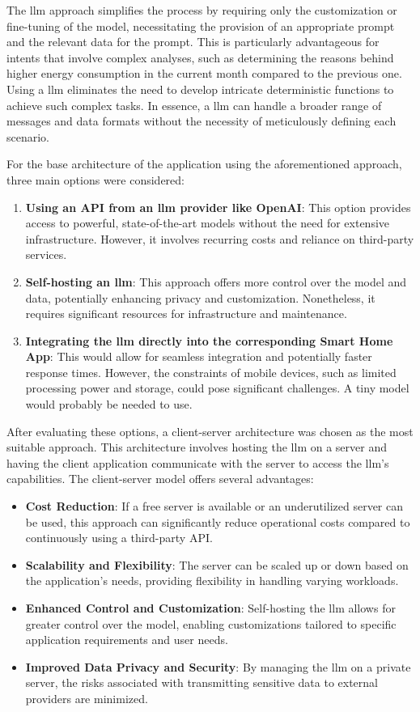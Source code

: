 The \gls{llm} approach simplifies the process by requiring only the customization or fine-tuning of the model, necessitating the provision of an appropriate prompt and the relevant data for the prompt. This is particularly advantageous for intents that involve complex analyses, such as determining the reasons behind higher energy consumption in the current month compared to the previous one. Using a \gls{llm} eliminates the need to develop intricate deterministic functions to achieve such complex tasks. In essence, a \gls{llm} can handle a broader range of messages and data formats without the necessity of meticulously defining each scenario.

For the base architecture of the application using the aforementioned approach, three main options were considered:
\begin{enumerate}
    \item \textbf{Using an API from an \gls{llm} provider like OpenAI}: This option provides access to powerful, state-of-the-art models without the need for extensive infrastructure. However, it involves recurring costs and reliance on third-party services.
    \item \textbf{Self-hosting an \gls{llm}}: This approach offers more control over the model and data, potentially enhancing privacy and customization. Nonetheless, it requires significant resources for infrastructure and maintenance.
    \item \textbf{Integrating the \gls{llm} directly into the corresponding Smart Home App}: This would allow for seamless integration and potentially faster response times. However, the constraints of mobile devices, such as limited processing power and storage, could pose significant challenges. A tiny model would probably be needed to use.
\end{enumerate}

After evaluating these options, a client-server architecture was chosen as the most suitable approach. This architecture involves hosting the \gls{llm} on a server and having the client application communicate with the server to access the \gls{llm}'s capabilities. The client-server model offers several advantages:

\begin{itemize}
    \item \textbf{Cost Reduction}: If a free server is available or an underutilized server can be used, this approach can significantly reduce operational costs compared to continuously using a third-party API.
    \item \textbf{Scalability and Flexibility}: The server can be scaled up or down based on the application's needs, providing flexibility in handling varying workloads.
    \item \textbf{Enhanced Control and Customization}: Self-hosting the \gls{llm} allows for greater control over the model, enabling customizations tailored to specific application requirements and user needs.
    \item \textbf{Improved Data Privacy and Security}: By managing the \gls{llm} on a private server, the risks associated with transmitting sensitive data to external providers are minimized.
\end{itemize}

